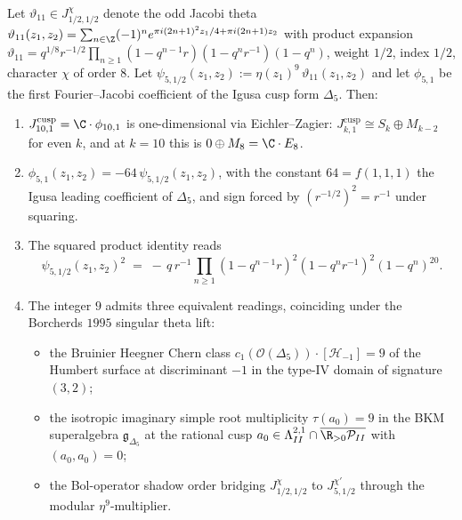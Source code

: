 \begin{lemma}
\label{lem:bol-bruinier-eta9-heegner-vol3}
Let $\vartheta_{11}\in J_{1/2,1/2}^{\chi}$ denote the odd Jacobi theta
$\vartheta_{11}(z_1,z_2) = \sum_{n\in\Z}(-1)^n e^{\pi i(2n+1)^2 z_1/4 +
\pi i(2n+1)z_2}$ with product expansion
$\vartheta_{11} = q^{1/8} r^{-1/2}\!\prod_{n\ge 1}(1-q^{n-1}r)(1-q^{n}r^{-1})(1-q^{n})$,
weight $1/2$, index $1/2$, character $\chi$ of order $8$. Let
$\psi_{5,1/2}(z_1,z_2) := \eta(z_1)^{9}\,\vartheta_{11}(z_1,z_2)$ and
let $\phi_{5,1}$ be the first Fourier--Jacobi coefficient of the
Igusa cusp form $\Delta_5$. Then:
\begin{enumerate}
\item[$(i)$] $J_{10,1}^{\mathrm{cusp}} = \C\cdot\phi_{10,1}$ is
one-dimensional via Eichler--Zagier: $J_{k,1}^{\mathrm{cusp}}\cong
S_k\oplus M_{k-2}$ for even $k$, and at $k=10$ this is
$0\oplus M_8 = \C\cdot E_8$.
\item[$(ii)$] $\phi_{5,1}(z_1,z_2) = -64\,\psi_{5,1/2}(z_1,z_2)$, with
the constant $64 = f(1,1,1)$ the Igusa leading coefficient of
$\Delta_5$, and sign forced by $(r^{-1/2})^2 = r^{-1}$ under squaring.
\item[$(iii)$] The squared product identity reads
\[
\psi_{5,1/2}(z_1,z_2)^{2} \;=\; -\,q\,r^{-1}\!\prod_{n\ge 1}(1-q^{n-1}r)^{2}(1-q^{n}r^{-1})^{2}(1-q^{n})^{20}.
\]
\item[$(iv)$] The integer $9$ admits three equivalent readings,
coinciding under the Borcherds $1995$ singular theta lift:
\begin{itemize}
\item the Bruinier Heegner Chern class
$c_1(\mathcal O(\Delta_5))\cdot[\mathcal H_{-1}] = 9$ of the Humbert
surface at discriminant $-1$ in the type-IV domain of signature
$(3,2)$;
\item the isotropic imaginary simple root multiplicity $\tau(a_0)=9$
in the BKM superalgebra $\mathfrak g_{\Delta_5}$ at the rational cusp
$a_0\in\Lambda^{2,1}_{II}\cap\overline{\R_{>0}\mathcal P_{II}}$ with
$(a_0,a_0)=0$;
\item the Bol-operator shadow order bridging $J_{1/2,1/2}^{\chi}$ to
$J_{5,1/2}^{\chi'}$ through the modular $\eta^{9}$-multiplier.
\end{itemize}
\end{enumerate}
\end{lemma}

